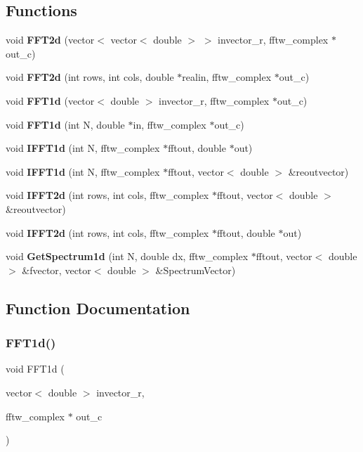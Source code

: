 \subsection*{Functions}
\begin{DoxyCompactItemize}
\item 
void \textbf{ F\+F\+T2d} (vector$<$ vector$<$ double $>$ $>$ invector\+\_\+r, fftw\+\_\+complex $\ast$out\+\_\+c)
\item 
void \textbf{ F\+F\+T2d} (int rows, int cols, double $\ast$realin, fftw\+\_\+complex $\ast$out\+\_\+c)
\item 
void \textbf{ F\+F\+T1d} (vector$<$ double $>$ invector\+\_\+r, fftw\+\_\+complex $\ast$out\+\_\+c)
\item 
void \textbf{ F\+F\+T1d} (int N, double $\ast$in, fftw\+\_\+complex $\ast$out\+\_\+c)
\item 
void \textbf{ I\+F\+F\+T1d} (int N, fftw\+\_\+complex $\ast$fftout, double $\ast$out)
\item 
void \textbf{ I\+F\+F\+T1d} (int N, fftw\+\_\+complex $\ast$fftout, vector$<$ double $>$ \&reoutvector)
\item 
void \textbf{ I\+F\+F\+T2d} (int rows, int cols, fftw\+\_\+complex $\ast$fftout, vector$<$ double $>$ \&reoutvector)
\item 
void \textbf{ I\+F\+F\+T2d} (int rows, int cols, fftw\+\_\+complex $\ast$fftout, double $\ast$out)
\item 
void \textbf{ Get\+Spectrum1d} (int N, double dx, fftw\+\_\+complex $\ast$fftout, vector$<$ double $>$ \&fvector, vector$<$ double $>$ \&Spectrum\+Vector)
\end{DoxyCompactItemize}


\subsection{Function Documentation}
\mbox{\label{FFTN_8h_aec6fc81ea724de209c50a8b3ab3be161_aec6fc81ea724de209c50a8b3ab3be161}} 
\subsubsection{F\+F\+T1d()\hspace{0.1cm}{\footnotesize\ttfamily [1/2]}}
{\footnotesize\ttfamily void F\+F\+T1d (\begin{DoxyParamCaption}\item[{vector$<$ double $>$}]{invector\+\_\+r,  }\item[{fftw\+\_\+complex $\ast$}]{out\+\_\+c }\end{DoxyParamCaption})}



